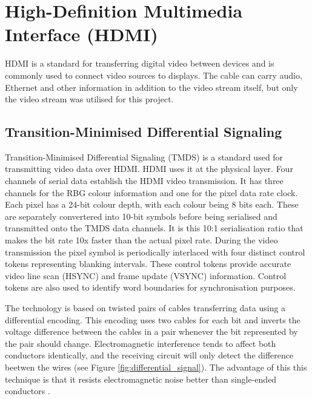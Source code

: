 \section{High-Definition Multimedia Interface (HDMI)}
HDMI is a standard for transferring digital video between devices and is commonly used to connect video sources to displays.
The cable can carry audio, Ethernet and other information in addition to the video stream itself, but only the video stream was utilised for this project.

\subsection{Transition-Minimised Differential Signaling}
Transition-Minimised Differential Signaling (TMDS) is a standard used for transmitting video data over HDMI.
HDMI uses it at the physical layer.
Four channels of serial data establish the HDMI video transmission.
It has three channels for the RBG colour information and one for the pixel data rate clock.
Each pixel has a 24-bit colour depth, with each colour being 8 bits each.
These are separately convertered into 10-bit symbols before being serialised and transmitted onto the TMDS data channels.
It is this 10:1 serialisation ratio that makes the bit rate 10x faster than the actual pixel rate.
During the video transmission the pixel symbol is periodically interlaced with four distinct control tokens representing blanking intervals.
These control tokens provide accurate video line scan (HSYNC) and frame update (VSYNC) information.
Control tokens are also used to identify word boundaries for synchronisation purposes.

The technology is based on twisted pairs of cables transferring data using a differential encoding.
This encoding uses two cables for each bit and inverts the voltage difference between the cables in a pair whenever the bit represented by the pair should change.
Electromagnetic interference tends to affect both conductors identically, and the receiving circuit will only detect the difference beetwen the wires (see Figure \ref{fig:differential_signal}). The advantage of this this technique is that it resists electromagnetic noise better than single-ended conductors \cite{diffsig}.

